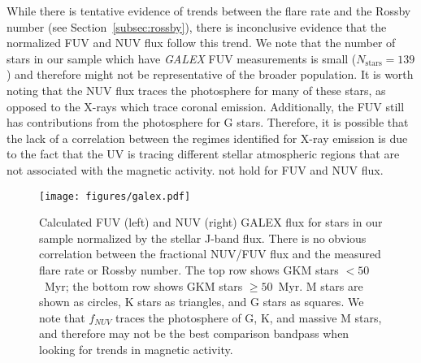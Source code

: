 \documentclass[twocolumn]{aastex631}
\begin{document}
While there is tentative evidence of trends between the flare rate and the Rossby number (see Section~\ref{subsec:rossby}), there is inconclusive evidence that the normalized FUV and NUV flux
follow this trend. We note that  the number of stars in our sample which have \textit{GALEX} FUV measurements is small ($N_\textrm{stars} = 139$) and therefore might not be representative of the
broader population. It is worth noting that the NUV flux traces the photosphere for many of these stars, as opposed to the X-rays which trace coronal emission. Additionally, the FUV still has
contributions from the photosphere for G stars. Therefore, it is possible that the lack of a correlation between the regimes identified for X-ray emission is due to the fact that the UV is tracing
different stellar atmospheric regions that are not associated with the magnetic activity. %
not hold for FUV and NUV flux.

\begin{figure}[ht!]
    \begin{centering}
        \texttt{[image: figures/galex.pdf]}
        \caption{
            Calculated FUV (left) and NUV (right) GALEX flux for stars in our
            sample normalized  by the stellar J-band flux.
            There is no obvious correlation between the fractional NUV/FUV flux and the measured
            flare rate or Rossby number.
            The top row shows GKM stars $<50$~Myr; the bottom row
            shows GKM stars $\geq 50$~Myr. M stars are shown as circles, K stars as
            triangles, and G stars as squares. We note that $f_{NUV}$ traces the
            photosphere of G, K, and massive M stars, and therefore may not be the best comparison
            bandpass when looking for trends in magnetic activity.
        }
        \label{fig:galex}
    \end{centering}
\end{figure}
\end{document}
